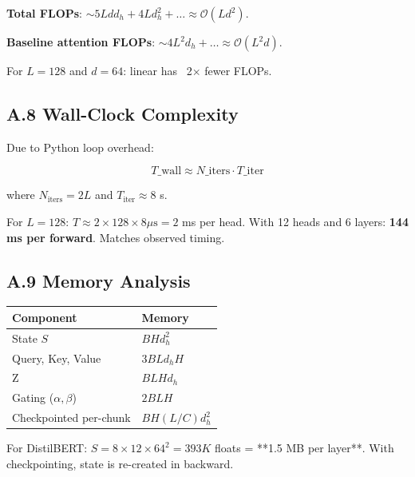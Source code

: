 \textbf{Total FLOPs}: $\sim 5 L d d_h + 4 L d_h^2 + \dots \approx \mathcal{O}(L d^2)$.

\textbf{Baseline attention FLOPs}: $\sim 4 L^2 d_h + \dots \approx \mathcal{O}(L^2 d)$.

For $L = 128$ and $d = 64$: linear has ~2$\times$ fewer FLOPs.

\subsection{A.8 Wall-Clock Complexity}

Due to Python loop overhead:

\[
T\_\text{wall} \approx N\_\text{iters} \cdot T\_\text{iter}
\tag{A.8}
\]

where $N_\text{iters} = 2L$ and $T_\text{iter} \approx 8$  s.

For $L = 128$: $T \approx 2 \times 128 \times 8 \mu\text{s} = 2$ ms per 
head. With 12 heads and 6 layers: \textbf{144 ms per forward}. Matches observed 
timing.

\subsection{A.9 Memory Analysis}

\begin{table}[H]
\centering
\small
\begin{tabular}{ll}
\toprule
\textbf{Component} & \textbf{Memory} \\
\midrule
State $S$ & $B H d_h^2$ \\
Query, Key, Value & $3 B L d_h H$ \\
Z & $B L H d_h$ \\
Gating ($\alpha, \beta$) & $2 B L H$ \\
Checkpointed per-chunk & $B H (L/C) d_h^2$ \\
\bottomrule
\end{tabular}
\end{table}

For DistilBERT: $S = 8 \times 12 \times 64^2 = 393K$ floats = **1.5 MB per 
layer**. With checkpointing, state is re-created in backward.

